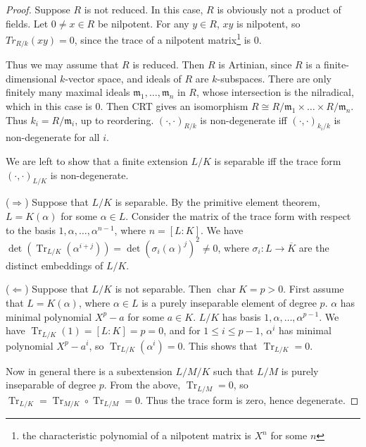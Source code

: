 \documentclass[11pt]{article}
\theoremstyle{definition}
\theoremstyle{plain}
\theoremstyle{remark}
\DeclareMathOperator{\Char}{char}
\DeclareMathOperator{\Tr}{Tr}
\newcommand{\fm}{\mathfrak{m}}
\begin{document}
\begin{proof}
    Suppose $R$ is not reduced. In this case, $R$ is obviously not a product of fields. Let $0 \neq x \in R$ be nilpotent. For any $y \in R$, $xy$ is nilpotent, so $Tr_{R/k}(xy) = 0$, since the trace of a nilpotent matrix\footnote{the characteristic polynomial of a nilpotent matrix is $X^n$ for some $n$} is $0$.

    Thus we may assume that $R$ is reduced. Then $R$ is Artinian, since $R$ is a finite-dimensional $k$-vector space, and ideals of $R$ are $k$-subspaces. There are only finitely many maximal ideals $\fm_1, \ldots, \fm_n$ in $R$, whose intersection is the nilradical, which in this case is $0$. Then CRT gives an isomorphism $R \cong R/\fm_1 \times \ldots \times R/\fm_n$. Thus $k_i = R / \fm_i$, up to reordering. $(\cdot, \cdot)_{R/k}$ is non-degenerate iff $(\cdot, \cdot)_{k_i/k}$ is non-degenerate for all $i$.

    We are left to show that a finite extension $L/K$ is separable iff the trace form $(\cdot, \cdot)_{L/K}$ is non-degenerate.

    \noindent ($\Rightarrow$) Suppose that $L/K$ is separable. By the primitive element theorem, $L = K(\alpha)$ for some $\alpha \in L$. Consider the matrix of the trace form with respect to the basis $1, \alpha, \ldots, \alpha^{n-1}$, where $n = [L : K]$. We have $\det(\Tr_{L/K}(\alpha^{i+j})) = \det(\sigma_i(\alpha)^j)^2 \neq 0$, where $\sigma_i : L \to \overline{K}$ are the distinct embeddings of $L/K$.

    \noindent ($\Leftarrow$) Suppose that $L/K$ is not separable. Then $\Char K = p > 0$. First assume that $L = K(\alpha)$, where $\alpha \in L$ is a purely inseparable element of degree $p$. $\alpha$ has minimal polynomial $X^p - a$ for some $a \in K$. $L / K$ has basis $1, \alpha, \ldots, \alpha^{p-1}$. We have $\Tr_{L/K}(1) = [L : K] = p = 0$, and for $1 \le i \le p-1$, $\alpha^i$ has minimal polynomial $X^p - a^i$, so $\Tr_{L/K}(\alpha^i) = 0$. This shows that $\Tr_{L/K} = 0$.

    Now in general there is a subextension $L/M/K$ such that $L/M$ is purely inseparable of degree $p$. From the above, $\Tr_{L/M} = 0$, so $\Tr_{L/K} = \Tr_{M/K} \circ \Tr_{L/M} = 0$. Thus the trace form is zero, hence degenerate.
\end{proof}
\end{document}
